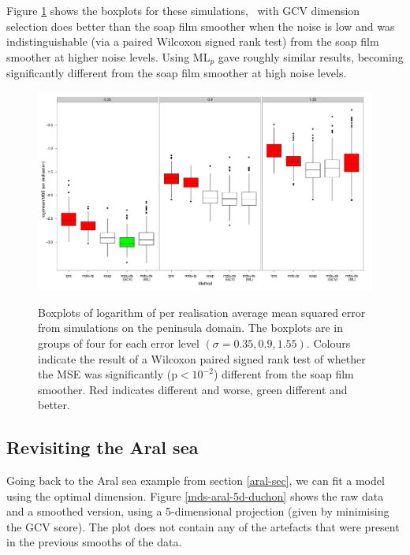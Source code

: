 Figure \ref{wt2-boxplot-duchon} shows the boxplots for these simulations, \mdsds\ with GCV dimension selection does better than the soap film smoother when the noise is low and was indistinguishable (via a paired Wilcoxon signed rank test) from the soap film smoother at higher noise levels. Using $\text{ML}_p$ gave roughly similar results, becoming significantly different from the soap film smoother at high noise levels.

\begin{figure}
\centering
\includegraphics[width=6in]{mds/figs/wt2-boxplot-duchon.pdf} \\
\caption{Boxplots of logarithm of per realisation average mean squared error from simulations on the peninsula domain. The boxplots are in groups of four for each error level $(\sigma = 0.35, 0.9, 1.55)$. Colours indicate the result of a Wilcoxon paired signed rank test of whether the MSE was significantly (p$<10^{-2}$) different from the soap film smoother. Red indicates different and worse, green different and better.}
\label{wt2-boxplot-duchon}
\end{figure}


\subsection{Revisiting the Aral sea}

Going back to the Aral sea example from section \ref{aral-sec}, we can fit a model using the optimal dimension. Figure \ref{mds-aral-5d-duchon} shows the raw data and a smoothed version, using a 5-dimensional projection (given by minimising the GCV score). The plot does not contain any of the artefacts that were present in the previous smooths of the data.

